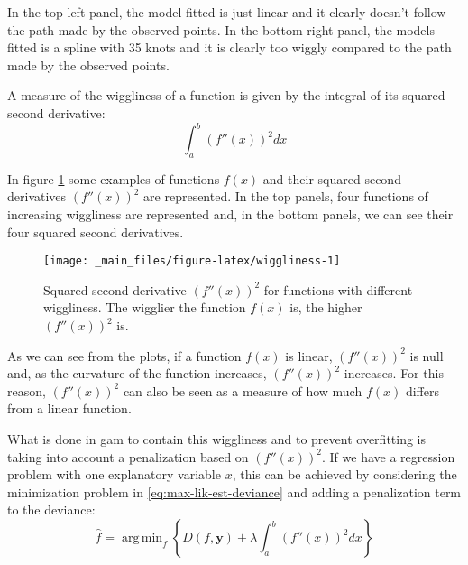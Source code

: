 \documentclass[a4paper, twoside, openright, 12pt]{report}
\DeclareMathOperator*{\argmin}{arg\,min}  %
\theoremstyle{definition}
\theoremstyle{definition}
\theoremstyle{definition}
\theoremstyle{remark}
\begin{document}
In the top-left panel, the model fitted is just linear and it clearly doesn't follow the path made by the observed points. In the bottom-right panel, the models fitted is a spline with 35 knots and it is clearly too wiggly compared to the path made by the observed points.

A measure of the wiggliness of a function is given by the integral of its squared second derivative:
\begin{equation}
\label{eq:wiggliness}
\int_{a}^{b}{\left( f''(x) \right)^2 dx}
\end{equation}

In figure \ref{fig:wiggliness} some examples of functions \(f(x)\) and their squared second derivatives \(\left(f''(x)\right)^2\) are represented. In the top panels, four functions of increasing wiggliness are represented and, in the bottom panels, we can see their four squared second derivatives.





\begin{figure}[!hbtp]

{\centering \texttt{[image: \_main\_files/figure-latex/wiggliness-1]} 

}

\caption[Squared second derivative \(\left(f''(x)\right)^2\) for functions with different wiggliness.]{Squared second derivative \(\left(f''(x)\right)^2\) for functions with different wiggliness. The wigglier the function \(f(x)\) is, the higher \(\left(f''(x)\right)^2\) is.}\label{fig:wiggliness}
\end{figure}

As we can see from the plots, if a function \(f(x)\) is linear, \(\left(f''(x)\right)^2\) is null and, as the curvature of the function increases, \(\left(f''(x)\right)^2\) increases. For this reason, \(\left(f''(x)\right)^2\) can also be seen as a measure of how much \(f(x)\) differs from a linear function.

What is done in \ac{gam} to contain this wiggliness and to prevent overfitting is taking into account a penalization based on \(\left(f''(x)\right)^2\). If we have a regression problem with one explanatory variable \(x\), this can be achieved by considering the minimization problem in \eqref{eq:max-lik-est-deviance} and adding a penalization term to the deviance:
\begin{equation}
\label{eq:gam-est-deviance}
\hat{f} = \argmin_{f}{\left\{D(f, \boldsymbol{y}) + \lambda \int_{a}^{b}{\left( f''(x) \right)^2 dx}\right\}}
\end{equation}
\end{document}

